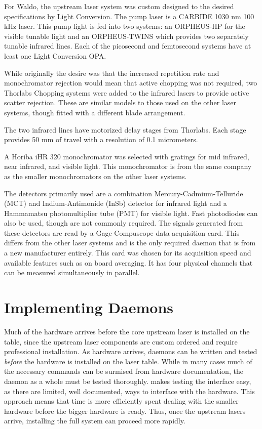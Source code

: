 For Waldo, the upstream laser system was custom designed to the desired specifications by Light Conversion.
The pump laser is a CARBIDE 1030 nm 100 kHz laser\cite{}.
This pump light is fed into two systems: an ORPHEUS-HP for the visible tunable light and an ORPHEUS-TWINS which provides two separately tunable infrared lines.
Each of the picosecond and femtosecond systems have at least one Light Conversion OPA.

While originally the desire was that the increased repetition rate and monochromator rejection would mean that active chopping was not required, two Thorlabs Chopping systems\cite{} were added to the infrared lasers to provide active scatter rejection.
These are similar models to those used on the other laser systems, though fitted with a different blade arrangement.

The two infrared lines have motorized delay stages from Thorlabs\cite{}.
Each stage provides 50 mm of travel with a resolution of 0.1 micrometers.

A Horiba iHR 320 monochromator\cite{} was selected with gratings for mid infrared, near infrared, and visible light.
This monochromator is from the same company as the smaller monochromators on the other laser systems.

The detectors primarily used are a combination Mercury-Cadmium-Telluride (MCT) and Indium-Antimonide (InSb) detector\cite{} for infrared light and a Hammamatsu photomultiplier tube (PMT)\cite{} for visible light.
Fast photodiodes can also be used, though are not commonly required.
The signals generated from these detectors are read by a Gage Compuscope data acquisition card\cite{}.
This differs from the other laser systems and is the only required daemon that is from a new manufacturer entirely.
This card was chosen for its acquisition speed and available features such as on board averaging.
It has four physical channels that can be measured simultaneously in parallel.


\clearpage

\section{Implementing Daemons}  %

Much of the hardware arrives before the core upstream laser is installed on the table, since the upstream laser components are custom ordered and require professional installation.
As hardware arrives, \yaq{} daemons can be written and tested \textit{before} the hardware is installed on the laser table.
While in many cases much of the necessary commands can be surmised from hardware documentation, the daemon as a whole must be tested thoroughly.
\yaq{} makes testing the interface easy, as there are limited, well documented, ways to interface with the hardware.
This approach means that time is more efficiently spent dealing with the smaller hardware before the bigger hardware is ready.
Thus, once the upstream lasers arrive, installing the full system can proceed more rapidly.


